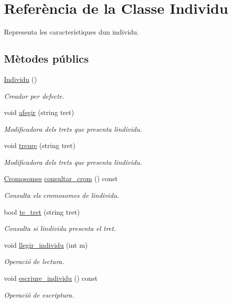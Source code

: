 \hypertarget{class_individu}{}\section{Referència de la Classe Individu}
\label{class_individu}


Representa les característiques d\textquotesingle{}un individu.  


\subsection*{Mètodes públics}
\begin{DoxyCompactItemize}
\item 
\hyperlink{class_individu_ac35091404cfbf11946694806aefa9e7e}{Individu} ()
\begin{DoxyCompactList}\small\item\em Creador per defecte. \end{DoxyCompactList}\item 
void \hyperlink{class_individu_a09f3188549ab207ae329ddf56ae6240f}{afegir} (string tret)
\begin{DoxyCompactList}\small\item\em Modificadora dels trets que presenta l\textquotesingle{}individu. \end{DoxyCompactList}\item 
void \hyperlink{class_individu_a8fbb728841cf4aefd304e10f4a6336a0}{treure} (string tret)
\begin{DoxyCompactList}\small\item\em Modificadora dels trets que presenta l\textquotesingle{}individu. \end{DoxyCompactList}\item 
\hyperlink{class_cromosomes}{Cromosomes} \hyperlink{class_individu_a39942c24ef726105afe2b193494985a0}{consultar\+\_\+crom} () const 
\begin{DoxyCompactList}\small\item\em Consulta els cromosomes de l\textquotesingle{}individu. \end{DoxyCompactList}\item 
bool \hyperlink{class_individu_a06cdcd2074fcf08fe55fe1e5014cd51b}{te\+\_\+tret} (string tret)
\begin{DoxyCompactList}\small\item\em Consulta si l\textquotesingle{}individu presenta el tret. \end{DoxyCompactList}\item 
void \hyperlink{class_individu_a03cd34a1eb0eaf4e0a1280ca8cc38a5f}{llegir\+\_\+individu} (int m)
\begin{DoxyCompactList}\small\item\em Operació de lectura. \end{DoxyCompactList}\item 
void \hyperlink{class_individu_af58b5637967c9ae9e27e62d5671d80a1}{escriure\+\_\+individu} () const 
\begin{DoxyCompactList}\small\item\em Operació de escriptura. \end{DoxyCompactList}\end{DoxyCompactItemize}
